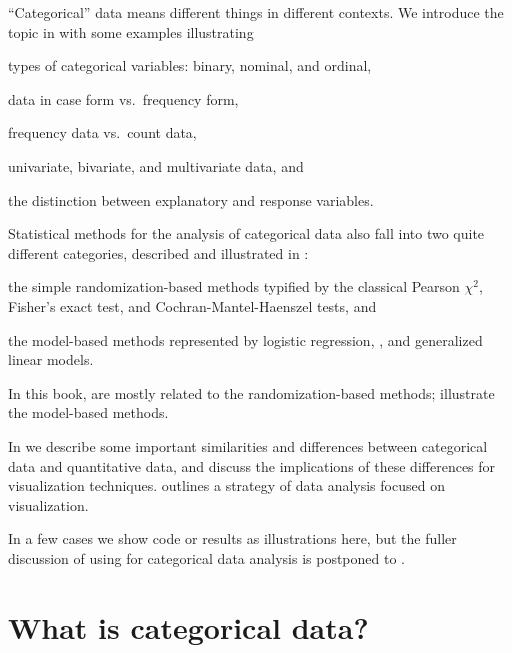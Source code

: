 \documentclass[11pt]{book}
\begin{document}
``Categorical'' data means different things in different
contexts.  We introduce the topic in 
with some examples illustrating
\begin{seriate}
\item types of categorical variables: binary, nominal, and ordinal,
\item data in case form vs.\ frequency form,
\item frequency data vs.\ count data,
\item univariate, bivariate, and multivariate data, and
\item the distinction between explanatory and response variables.
\end{seriate}

Statistical methods for the analysis of categorical data also fall into two
quite different categories, described and illustrated in : 
\begin{seriate}
\item the simple randomization-based
methods typified by
the classical Pearson $\chi^2$, Fisher's exact test, and Cochran-Mantel-Haenszel
tests, and 
\item the model-based methods represented by
logistic regression, \loglin, and generalized linear models.
\end{seriate}
In this book, 
are mostly related to the randomization-based methods; 
illustrate the model-based methods.

In  we describe some important similarities
and 
differences between categorical data and
quantitative data, and discuss the implications of these differences for
visualization techniques.
 outlines a strategy of data analysis
focused on visualization.

In a few cases we show \R code or results as illustrations here,
but the fuller discussion of using \R for categorical data
analysis is postponed to .


\section{What is categorical data?}\label{sec:whatis}
\end{document}

